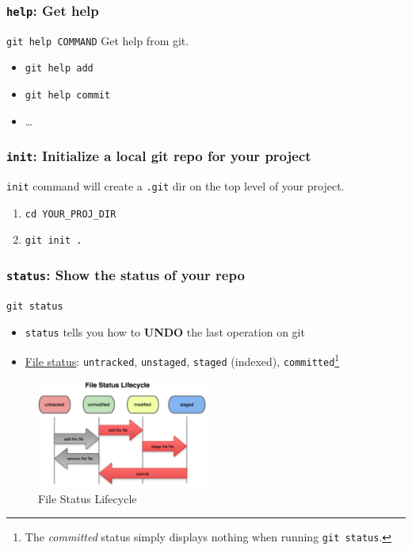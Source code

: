 \documentclass[11pt,ignorenonframetext,]{beamer}
\begin{document}
\begin{frame}[fragile, label=githelp]\frametitle{\texttt{help}: Get help}

\texttt{git help COMMAND} Get help from git.

\begin{itemize}
\item
  \texttt{git help add}
\item
  \texttt{git help commit}
\item
  \ldots{}
\end{itemize}
\end{frame}

\begin{frame}[fragile, label=gitinit]\frametitle{\texttt{init}: Initialize a local git
repo for your project}

\texttt{init} command will create a \texttt{.git} dir on the top level
of your project.

\begin{enumerate}[1.]
\item
  \texttt{cd YOUR\_PROJ\_DIR}
\item
  \texttt{git init .}
\end{enumerate}
\end{frame}

\begin{frame}[fragile, label=gitstatus]\frametitle{\texttt{status}: Show the status of
your repo}

\texttt{git status}

\begin{itemize}
\item
  \texttt{status} tells you how to \textbf{UNDO} the last operation on
  git
\item
  \href{http://progit.org/book/ch2-2.html}{File status}:
  \texttt{untracked}, \texttt{unstaged}, \texttt{staged} (indexed),
  \texttt{committed}\footnote{The \emph{committed} status simply
    displays nothing when running \texttt{git status}.}
\end{itemize}
\begin{figure}[htbp]
\centering
\includegraphics[width=0.5\textwidth]{figures/gitlifecycle.png}
\caption{File Status Lifecycle}
\end{figure}

\end{frame}
\end{document}
